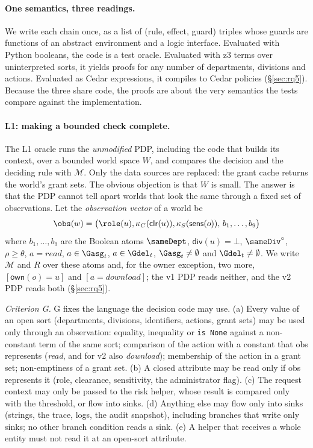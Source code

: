 \paragraph{One semantics, three readings.} We write each chain once, as a list of (rule, effect, guard)
triples whose guards are functions of an abstract environment and a logic interface. Evaluated with Python
booleans, the code is a test oracle. Evaluated with z3 \cite{demoura2008z3} terms over uninterpreted sorts, it
yields proofs for any number of departments, divisions and actions. Evaluated as Cedar expressions, it compiles
to Cedar policies (\S\ref{sec:rq5}). Because the three share code, the proofs are about the very semantics
the tests compare against the implementation.

\paragraph{L1: making a bounded check complete.} The L1 oracle runs the \emph{unmodified} PDP, including the
code that builds its context, over a bounded world space $W$, and compares the decision and the deciding rule
with $\mathcal{M}$. Only the data sources are replaced: the grant cache returns the world's grant sets. The
obvious objection is that $W$ is small. The answer is that the PDP cannot tell apart worlds that look the same
through a fixed set of observations. Let the \emph{observation vector} of a world be
\[
\obs(w)=\bigl(\role(u),\kappa_C(\mathsf{clr}(u)),\kappa_S(\mathsf{sens}(o)),\,b_1,\dots,b_9\bigr)
\]
where $b_1,\dots,b_9$ are the Boolean atoms $\sameDept$, $\mathsf{div}(u)=\bot$, $\sameDiv^\circ$,
$\rho\ge\theta$, $a=\mathit{read}$, $a\in\Gasg_t$, $a\in\Gdel_t$, $\Gasg_t\neq\emptyset$ and $\Gdel_t\neq\emptyset$.
We write $\mathcal{M}$ and $R$ over these atoms and, for the owner exception, two more,
$[\mathsf{own}(o)=u]$ and $[a=\mathit{download}]$; the v1 PDP reads neither, and the v2 PDP reads both
(\S\ref{sec:rq5}).

\emph{Criterion G.} G fixes the language the decision code may use. (a) Every value of an open sort
(departments, divisions, identifiers, actions, grant sets) may be used only through an observation: equality,
inequality or \texttt{is None} against a non-constant term of the same sort; comparison of the action with a
constant that obs represents (\emph{read}, and for v2 also \emph{download}); membership of the action in a grant set; non-emptiness of a
grant set. (b) A closed attribute may be read only if obs represents it (role, clearance, sensitivity, the
administrator flag). (c) The request context may only be passed to the risk helper, whose result is compared only
with the threshold, or flow into sinks. (d) Anything else may flow only into sinks (strings, the trace, logs, the
audit snapshot), including branches that write only sinks; no other branch condition reads a sink. (e) A helper
that receives a whole entity must not read it at an open-sort attribute.


